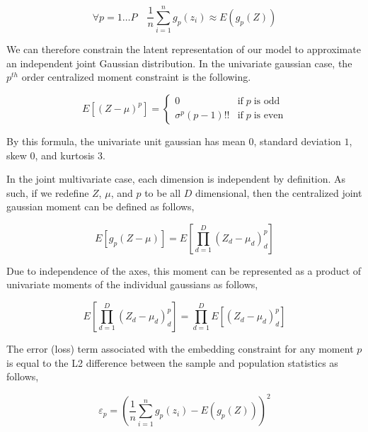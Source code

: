 \documentclass[10pt,twocolumn,letterpaper]{article}
\begin{document}
\begin{equation}
	\forall p=1 \dots P \quad
	\frac{1}{n} \sum_{i=1}^n g_p(z_i) \approx E(g_p(Z))
\end{equation}

We can therefore constrain the latent representation of our model to approximate an independent joint Gaussian distribution. 
In the univariate gaussian case, the $p^{th}$ order centralized moment constraint is the following.

\begin{equation}
	E\left[ (Z-\mu)^p \right] = 
	\begin{cases} 
		0 &  \text{if} \; p \; \text{is odd} \\
		\sigma^p(p - 1)!! & \text{if} \; p \; \text{is even}
	\end{cases}
\end{equation}

By this formula, the univariate unit gaussian has mean $0$, standard deviation $1$, skew $0$, and kurtosis $3$.

In the joint multivariate case, each dimension is independent by definition.  As such, if we redefine $Z$, $\mu$, and $p$ to be all $D$ dimensional, then the centralized joint gaussian moment can be defined as follows,

\begin{equation}
	E\left[g_p(Z - \mu)\right] = E\left[ \prod_{d=1}^D (Z_d - \mu_d)^p_d \right]
\end{equation}

Due to independence of the axes, this moment can be represented as a product of univariate moments of the individual gaussians as follows,

\begin{equation}
	E\left[ \prod_{d=1}^D (Z_d - \mu_d)^p_d \right] = \prod_{d=1}^D E\left[ (Z_d - \mu_d)^p_d \right]
\end{equation}

The error (loss) term associated with the embedding constraint for any moment $p$ is equal to the L2 difference between the sample and population statistics as follows,

\begin{equation}
	\varepsilon_p = \left( \frac{1}{n} \sum_{i=1}^n g_p(z_i) - E(g_p(Z)) \right)^2
\end{equation}
\end{document}
